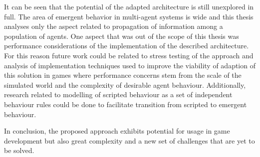 It can be seen that the potential of the adapted architecture is still unexplored in full.
The area of emergent behavior in multi-agent systems is wide and this thesis analyses only the aspect related to propagation of information among a population of agents.
One aspect that was out of the scope of this thesis was performance considerations of the implementation of the described architecture.
For this reason future work could be related to stress testing of the approach and analysis of implementation techniques used to improve the viability of adaption of this solution in games where performance concerns stem from the scale of the simulated world and the complexity of desirable agent behaviour.
Additionally, research related to modelling of scripted behaviour as a set of independent behaviour rules could be done to facilitate transition from scripted to emergent behaviour.

In conclusion, the proposed approach exhibits potential for usage in game development but also great complexity and a new set of challenges that are yet to be solved.